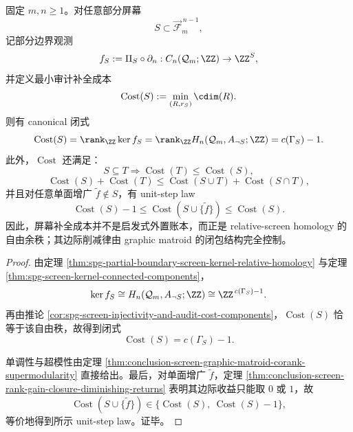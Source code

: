 \begin{theorem}[屏幕补全成本的相对同调余秩闭式与超模律]\label{thm:conclusion-fixedresolution-screen-corank-audit-cost-law}
固定 \(m,n\ge 1\)。对任意部分屏幕
\[
S\subset \overrightarrow{\mathcal F}^{\,n-1}_m,
\]
记部分边界观测
\[
f_S:=\Pi_S\circ\partial_n:C_n(\mathcal Q_m;\ZZ)\to \ZZ^S,
\]
并定义最小审计补全成本
\[
\operatorname{Cost}(S):=\min_{(R,r_S)}\cdim(R).
\]
则有 canonical 闭式
\[
\operatorname{Cost}(S)
=
\rank_\ZZ \ker f_S
=
\rank_\ZZ H_n(\mathcal Q_m,A_{\neg S};\ZZ)
=
c(\Gamma_S)-1.
\]
此外，\(\operatorname{Cost}\) 还满足：
\[
S\subseteq T
\Longrightarrow
\operatorname{Cost}(T)\le \operatorname{Cost}(S),
\]
\[
\operatorname{Cost}(S)+\operatorname{Cost}(T)
\le
\operatorname{Cost}(S\cup T)+\operatorname{Cost}(S\cap T),
\]
并且对任意单面增广 \(\tilde f\notin S\)，有 unit-step law
\[
\operatorname{Cost}(S)-1
\le
\operatorname{Cost}(S\cup\{\tilde f\})
\le
\operatorname{Cost}(S).
\]
因此，屏幕补全成本并不是启发式外置账本，而正是 relative-screen homology 的自由余秩；其边际削减律由 graphic matroid 的闭包结构完全控制。
\end{theorem}

\begin{proof}
由定理 \ref{thm:spg-partial-boundary-screen-kernel-relative-homology} 与定理 \ref{thm:spg-screen-kernel-connected-components}，
\[
\ker f_S
\cong
H_n(\mathcal Q_m,A_{\neg S};\ZZ)
\cong
\ZZ^{\,c(\Gamma_S)-1}.
\]
再由推论 \ref{cor:spg-screen-injectivity-and-audit-cost-components}，\(\operatorname{Cost}(S)\) 恰等于该自由秩，故得到闭式
\[
\operatorname{Cost}(S)=c(\Gamma_S)-1.
\]

单调性与超模性由定理 \ref{thm:conclusion-screen-graphic-matroid-corank-supermodularity} 直接给出。最后，对单面增广 \(\tilde f\)，定理 \ref{thm:conclusion-screen-rank-gain-closure-diminishing-returns} 表明其边际收益只能取 \(0\) 或 \(1\)，故
\[
\operatorname{Cost}(S\cup\{\tilde f\})
\in
\{\operatorname{Cost}(S),\ \operatorname{Cost}(S)-1\},
\]
等价地得到所示 unit-step law。证毕。
\end{proof}

